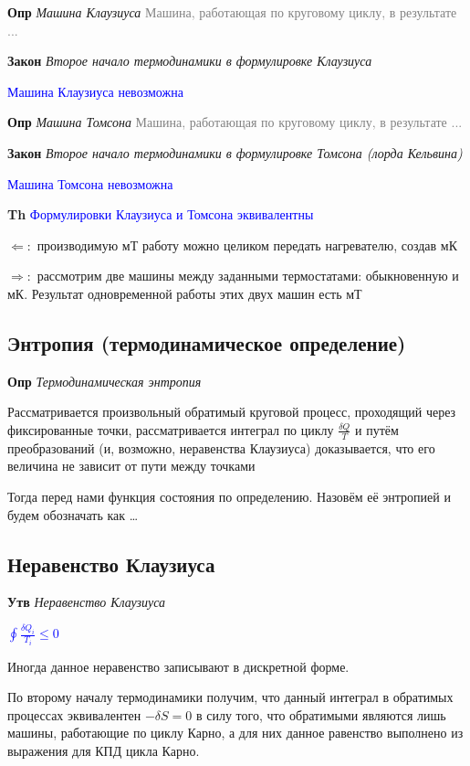 \documentclass[a4paper, 14pt]{article}
\begin{document}
    \textbf{Опр} \textit{Машина Клаузиуса} \textcolor{gray}{Машина, работающая по круговому циклу, в результате ...}

    \textbf{Закон} \textit{Второе начало термодинамики в формулировке Клаузиуса}

    \textcolor{blue}{Машина Клаузиуса невозможна}

    \textbf{Опр} \textit{Машина Томсона} \textcolor{gray}{Машина, работающая по круговому циклу, в результате ...}

    \textbf{Закон} \textit{Второе начало термодинамики в формулировке Томсона (лорда Кельвина)}

    \textcolor{blue}{Машина Томсона невозможна}

    \textbf{Th} \textcolor{blue}{Формулировки Клаузиуса и Томсона эквивалентны}

    $\Leftarrow:$ производимую мТ работу можно целиком передать нагревателю, создав мК

    $\Rightarrow:$ рассмотрим две машины между заданными термостатами: обыкновенную и мК.
    Результат одновременной работы этих двух машин есть мТ

    \subsection{Энтропия (термодинамическое определение)}

    \textbf{Опр} \textit{Термодинамическая энтропия}

    Рассматривается произвольный обратимый круговой процесс, проходящий через фиксированные точки, рассматривается
    интеграл по циклу $\frac{\delta Q}{T}$ и путём преобразований (и, возможно, неравенства Клаузиуса) доказывается,
    что его величина не зависит от пути между точками

    Тогда перед нами функция состояния по определению.
    Назовём её энтропией и будем обозначать как \ldots

    \subsection{Неравенство Клаузиуса}

    \textbf{Утв} \textit{Неравенство Клаузиуса}

    \textcolor{blue}{$\oint \frac{\delta Q_i}{T_i} \leq 0$}

    Иногда данное неравенство записывают в дискретной форме.

    По второму началу термодинамики получим, что данный интеграл в обратимых процессах эквивалентен $-\delta S = 0$ в
    силу того, что обратимыми являются лишь машины, работающие по циклу Карно, а для них данное равенство выполнено
    из выражения для КПД цикла Карно.
\end{document}
